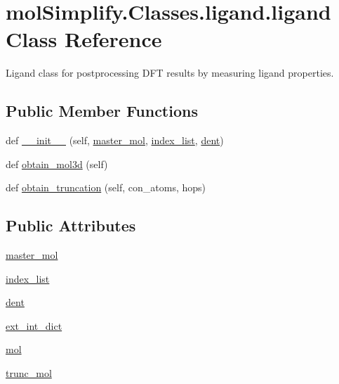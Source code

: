 \hypertarget{classmolSimplify_1_1Classes_1_1ligand_1_1ligand}{}\section{mol\+Simplify.\+Classes.\+ligand.\+ligand Class Reference}
\label{classmolSimplify_1_1Classes_1_1ligand_1_1ligand}


Ligand class for postprocessing D\+FT results by measuring ligand properties.  


\subsection*{Public Member Functions}
\begin{DoxyCompactItemize}
\item 
def \hyperlink{classmolSimplify_1_1Classes_1_1ligand_1_1ligand_ab9c068d82f0bb9b6494a734558930984}{\+\_\+\+\_\+init\+\_\+\+\_\+} (self, \hyperlink{classmolSimplify_1_1Classes_1_1ligand_1_1ligand_a4789951476ce69aa2b606b97ac535f41}{master\+\_\+mol}, \hyperlink{classmolSimplify_1_1Classes_1_1ligand_1_1ligand_ab9dfcb555aa0d747bf5e824c70149684}{index\+\_\+list}, \hyperlink{classmolSimplify_1_1Classes_1_1ligand_1_1ligand_aba886d417452a3657a9c6d5e091af3d1}{dent})
\item 
def \hyperlink{classmolSimplify_1_1Classes_1_1ligand_1_1ligand_a17875db54ebc0308065d8efdcdd736c4}{obtain\+\_\+mol3d} (self)
\item 
def \hyperlink{classmolSimplify_1_1Classes_1_1ligand_1_1ligand_a26d131235b504f894e47e483f105fbfd}{obtain\+\_\+truncation} (self, con\+\_\+atoms, hops)
\end{DoxyCompactItemize}
\subsection*{Public Attributes}
\begin{DoxyCompactItemize}
\item 
\hyperlink{classmolSimplify_1_1Classes_1_1ligand_1_1ligand_a4789951476ce69aa2b606b97ac535f41}{master\+\_\+mol}
\item 
\hyperlink{classmolSimplify_1_1Classes_1_1ligand_1_1ligand_ab9dfcb555aa0d747bf5e824c70149684}{index\+\_\+list}
\item 
\hyperlink{classmolSimplify_1_1Classes_1_1ligand_1_1ligand_aba886d417452a3657a9c6d5e091af3d1}{dent}
\item 
\hyperlink{classmolSimplify_1_1Classes_1_1ligand_1_1ligand_a09ffd49db7deee15e5c2a47fba17d50b}{ext\+\_\+int\+\_\+dict}
\item 
\hyperlink{classmolSimplify_1_1Classes_1_1ligand_1_1ligand_ad43e7d608bcb256aa79d4b54755070b5}{mol}
\item 
\hyperlink{classmolSimplify_1_1Classes_1_1ligand_1_1ligand_a1ffdc17b9247581d021fa83aee591e96}{trunc\+\_\+mol}
\end{DoxyCompactItemize}


